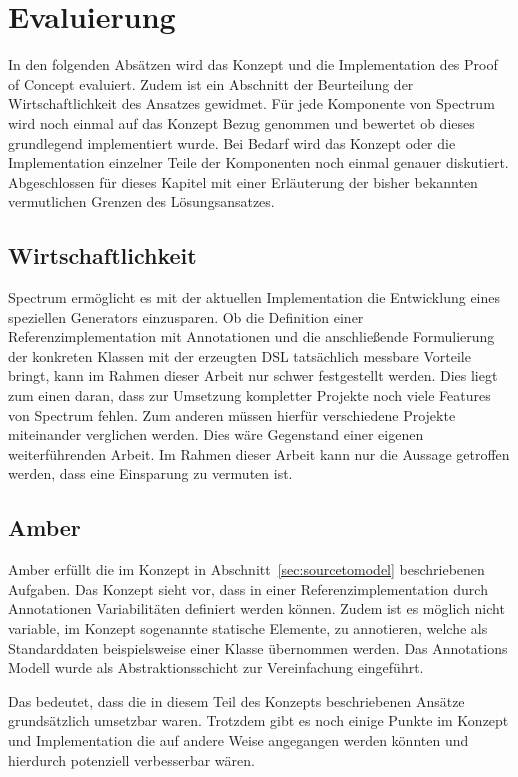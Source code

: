 \documentclass[12pt,oneside,a4paper,parskip]{scrbook}
\begin{document}
\chapter{Evaluierung}

In den folgenden Absätzen wird das Konzept und die Implementation des Proof of Concept evaluiert. Zudem ist ein Abschnitt der Beurteilung der Wirtschaftlichkeit des Ansatzes gewidmet. Für jede Komponente von Spectrum wird noch einmal auf das Konzept Bezug genommen und bewertet ob dieses grundlegend implementiert wurde. Bei Bedarf wird das Konzept oder die Implementation einzelner Teile der Komponenten noch einmal genauer diskutiert. Abgeschlossen für dieses Kapitel mit einer Erläuterung der bisher bekannten vermutlichen Grenzen des Lösungsansatzes.

\section{Wirtschaftlichkeit}

Spectrum ermöglicht es mit der aktuellen Implementation die Entwicklung eines speziellen Generators einzusparen. Ob die Definition einer Referenzimplementation mit Annotationen und die anschließende Formulierung der konkreten Klassen mit der erzeugten DSL tatsächlich messbare Vorteile bringt, kann im Rahmen dieser Arbeit nur schwer festgestellt werden. Dies liegt zum einen daran, dass zur Umsetzung kompletter Projekte noch viele Features von Spectrum fehlen. Zum anderen müssen hierfür verschiedene Projekte miteinander verglichen werden. Dies wäre Gegenstand einer eigenen weiterführenden Arbeit. Im Rahmen dieser Arbeit kann nur die Aussage getroffen werden, dass eine Einsparung zu vermuten ist.

\section{Amber}

Amber erfüllt die im Konzept in Abschnitt~\ref{sec:sourcetomodel} beschriebenen Aufgaben. Das Konzept sieht vor, dass in einer Referenzimplementation durch Annotationen Variabilitäten definiert werden können. Zudem ist es möglich nicht variable, im Konzept sogenannte statische Elemente, zu annotieren, welche als Standarddaten beispielsweise einer Klasse übernommen werden. Das Annotations Modell wurde als Abstraktionsschicht zur Vereinfachung eingeführt.

Das bedeutet, dass die in diesem Teil des Konzepts beschriebenen Ansätze grundsätzlich umsetzbar waren. Trotzdem gibt es noch einige Punkte im Konzept und Implementation die auf andere Weise angegangen werden könnten und hierdurch potenziell verbesserbar wären.
\end{document}
